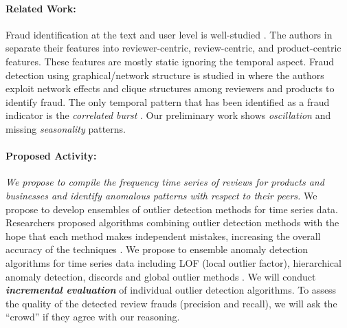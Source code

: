 
\paragraph{Related Work:}

Fraud identification at the text and user level is well-studied  \cite{Ott:11,Jindal:08,Morales:13,Chau:06}. The authors in \cite{Jindal:08} separate their features into reviewer-centric, review-centric, and product-centric features. These features are mostly static ignoring the temporal aspect. Fraud detection using graphical/network structure is studied in \cite{Akoglu:13,Chau:06,Wang:11} where the authors exploit network effects and clique structures among reviewers and products to identify fraud. The only temporal pattern that has been identified as a fraud indicator is the {\it correlated burst} \cite{Xie:12,Fei:13}. Our preliminary work \cite{Minnich2015} shows {\it oscillation} and missing {\it seasonality} patterns.





\paragraph{Proposed Activity:} {\it We propose to compile the frequency time series of reviews for products and businesses and identify anomalous patterns with respect to their peers.}
We propose to develop ensembles of outlier detection methods for time series data. Researchers proposed algorithms combining outlier detection methods with the hope that each method makes independent mistakes, increasing the overall accuracy of the techniques \cite{Schubert:12,Charu2013}. We propose to ensemble anomaly detection algorithms for time series data including LOF (local outlier factor), hierarchical anomaly detection, discords and global outlier methods \cite{Chandola:09}. We will conduct \textbf{\textit{incremental evaluation}} of individual outlier detection algorithms. To assess the quality of the detected review frauds (precision and recall), we will ask the ``crowd'' if they agree with our reasoning.


